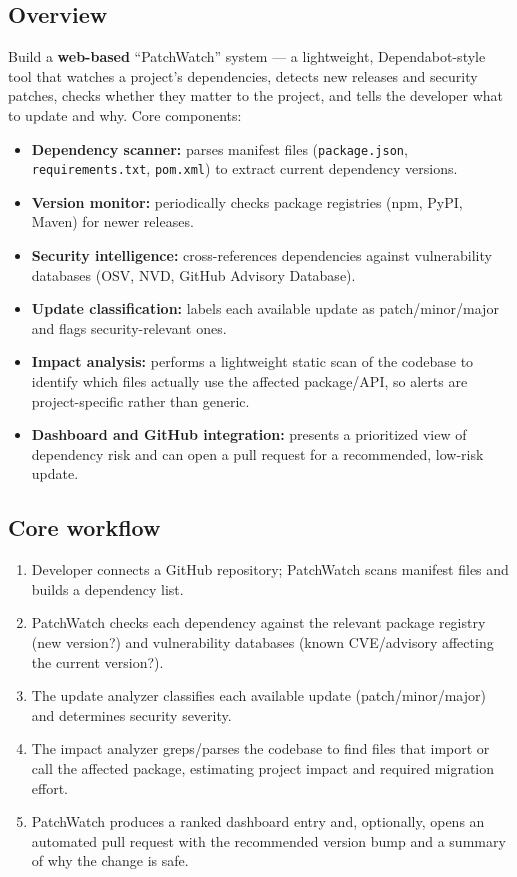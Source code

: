 \documentclass[11pt,a4paper]{article}
\begin{document}
\subsection{Overview}
Build a \textbf{web-based} ``PatchWatch'' system --- a lightweight, Dependabot-style tool that watches a project's dependencies, detects new releases and security patches, checks whether they matter to the project, and tells the developer what to update and why. Core components:
\begin{itemize}[leftmargin=0.7cm]
    \item \textbf{Dependency scanner:} parses manifest files (\texttt{package.json}, \texttt{requirements.txt}, \texttt{pom.xml}) to extract current dependency versions.
    \item \textbf{Version monitor:} periodically checks package registries (npm, PyPI, Maven) for newer releases.
    \item \textbf{Security intelligence:} cross-references dependencies against vulnerability databases (OSV, NVD, GitHub Advisory Database).
    \item \textbf{Update classification:} labels each available update as patch/minor/major and flags security-relevant ones.
    \item \textbf{Impact analysis:} performs a lightweight static scan of the codebase to identify which files actually use the affected package/API, so alerts are project-specific rather than generic.
    \item \textbf{Dashboard and GitHub integration:} presents a prioritized view of dependency risk and can open a pull request for a recommended, low-risk update.
\end{itemize}

\subsection{Core workflow}
\begin{enumerate}[leftmargin=0.7cm]
    \item Developer connects a GitHub repository; PatchWatch scans manifest files and builds a dependency list.
    \item PatchWatch checks each dependency against the relevant package registry (new version?) and vulnerability databases (known CVE/advisory affecting the current version?).
    \item The update analyzer classifies each available update (patch/minor/major) and determines security severity.
    \item The impact analyzer greps/parses the codebase to find files that import or call the affected package, estimating project impact and required migration effort.
    \item PatchWatch produces a ranked dashboard entry and, optionally, opens an automated pull request with the recommended version bump and a summary of why the change is safe.
\end{enumerate}
\end{document}
